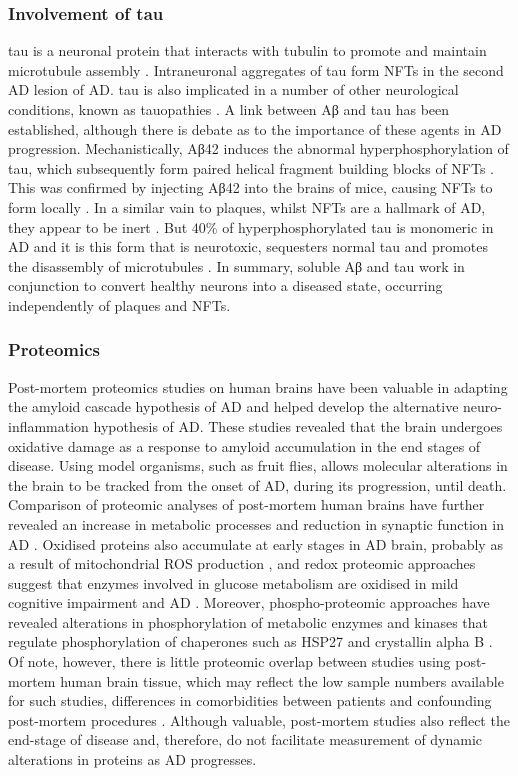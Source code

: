 \subsubsection{Involvement of tau}

tau is a neuronal protein that interacts with tubulin to promote
and maintain microtubule assembly \cite{Weingarten1975}.
Intraneuronal aggregates of tau form NFTs in the second AD lesion of AD.
tau is also implicated in a number of other neurological conditions,
known as tauopathies \cite{Iqbal2010}.
A link between Aβ and tau has been established, although there is debate as to the
importance of these agents in AD progression.
Mechanistically, Aβ42 induces the abnormal hyperphosphorylation of tau,
which subsequently form paired helical fragment building blocks of NFTs \cite{Iqbal2010}.
This was confirmed by injecting Aβ42 into the brains of mice,
causing NFTs to form locally \cite{Gotz2001}.
In a similar vain to plaques, whilst NFTs are a hallmark of AD,
they appear to be inert \cite{Alonso2006}.
But $40\%$ of hyperphosphorylated tau is monomeric in AD \cite{Iqbal2010}
and it is this form that is neurotoxic, sequesters normal tau
and promotes the disassembly of microtubules \cite{Alonso1994}.
In summary, soluble Aβ and tau work in conjunction to convert healthy neurons into
a diseased state, occurring independently of plaques and NFTs.

\subsubsection{Proteomics}

Post-mortem proteomics studies on human brains have been valuable in adapting the amyloid cascade hypothesis of AD and helped develop the alternative neuro-inflammation hypothesis of AD.
These studies revealed that the brain undergoes oxidative damage as a response to amyloid accumulation in the end stages of disease.
Using model organisms, such as fruit flies, allows molecular alterations in the brain to be tracked from the onset of AD, during its progression, until death.
Comparison of proteomic analyses of post-mortem human brains have further revealed an increase in metabolic processes and reduction in synaptic function in AD \cite{Moya-Alvarado2016}.
Oxidised proteins also accumulate at early stages in AD brain, probably as a result of mitochondrial ROS production \cite{Lynn2010}, and redox proteomic approaches suggest that enzymes involved in glucose metabolism are oxidised in mild cognitive impairment and AD \cite{Butterfield2014,Aluise2011}.
Moreover, phospho-proteomic approaches have revealed alterations in phosphorylation of metabolic enzymes and kinases that regulate phosphorylation of chaperones such as HSP27 and crystallin alpha B \cite{Dammer2015}.
Of note, however, there is little proteomic overlap between studies using post-mortem human brain tissue, which may reflect the low sample numbers available for such studies, differences in comorbidities between patients and confounding post-mortem procedures \cite{Moya-Alvarado2016}.
Although valuable, post-mortem studies also reflect the end-stage of disease and, therefore, do not facilitate measurement of dynamic alterations in proteins as AD progresses.

